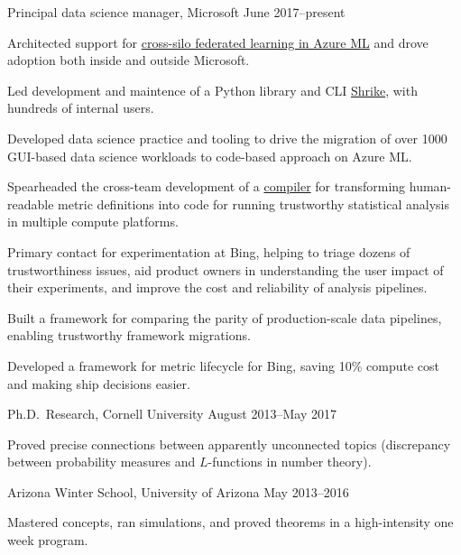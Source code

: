 \documentclass[11pt, letterpaper]{awesome-cv}
\begin{document}
\begin{cventries}

\cventry
  {Principal data science manager, Microsoft}
  {}{}
  {June 2017--present}
  {
    \begin{cvitems}
      \item{Architected support for \href{https://github.com/Azure-Samples/azure-ml-federated-learning}{cross-silo federated learning in Azure ML} and drove adoption both inside and outside Microsoft.}
      \item{Led development and maintence of a Python library and CLI \href{http://shrike-docs.com/}{Shrike}, with hundreds of internal users.}
      \item{Developed data science practice and tooling to drive the migration of over 1000 GUI-based data science workloads to code-based approach on Azure ML.}
      \item{Spearheaded the cross-team development of a \href{https://arxiv.org/abs/1912.00913}{compiler} for transforming human-readable metric definitions into code for running trustworthy statistical analysis in multiple compute platforms.}
      \item{Primary contact for experimentation at Bing, helping to triage dozens of trustworthiness issues, aid product owners in understanding the user impact of their experiments, and improve the cost and reliability of analysis pipelines.}
      \item{Built a framework for comparing the parity of production-scale data pipelines, enabling trustworthy framework migrations.}
      \item{Developed a framework for metric lifecycle for Bing, saving 10\% compute cost and making ship decisions easier.}
    \end{cvitems}
  }

\cventry
  {Ph.D.~Research, Cornell University}
  {}{}
  {August 2013--May 2017}
  {
    \begin{cvitems}
      \item{Proved precise connections between apparently unconnected topics (discrepancy between probability measures and $L$-functions in number theory).}
    \end{cvitems}
  }

\cventry
  {Arizona Winter School, University of Arizona}
  {}{}
  {May 2013--2016}
  {
    \begin{cvitems}
      \item{Mastered concepts, ran simulations, and proved theorems in a high-intensity one week program.}
    \end{cvitems}
  }
\end{cventries}
\end{document}
